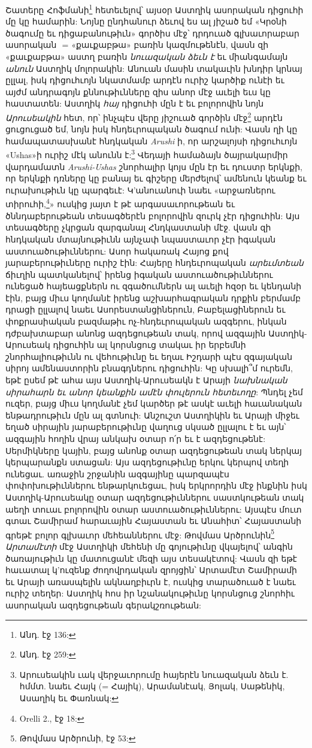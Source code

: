 \documentclass{article}
\newcommand*\svgAAAB{}
\begin{document}
{Շատերը Հոֆմանի\footnote{Անդ. էջ 136:} հետեւելով՝ այսօր Աստղիկ ասորական դիցուհի մը կը համարին: Նոյնը ընդհանուր ձեւով ես ալ յիշած եմ «Կրօնի ծագումը եւ դիցաբանութիւն» գործիս մէջ՝ դրդուած գլխաւորաբար ասորական $\svgAAAB$ = «քաւքաբթա» բառին կազմութենէն, վասն զի «քաւքաբթա» աստղ բառին \emph{նուազական ձեւն է} եւ միանգամայն \emph{անուն} Աստղիկ մոլորակին: Անուան մասին տակաւին խնդիր կրնայ ըլլալ, իսկ դիցուհւոյն նկատմամբ արդէն ուրիշ կարծիք ունէի եւ այժմ անդրագոյն քննութիւնները զիս անոր մէջ աւելի եւս կը հաստատեն: Աստղիկ \emph{հայ} դիցուհի մըն է եւ բոլորովին նոյն \emph{Արուսեակին} հետ, որ՝ ինչպէս վերը յիշուած գործին մէջ\footnote{Անդ. էջ 259:} արդէն ցուցուցած եմ, նոյն իսկ հնդեւրոպական ծագում ունի: Վասն ղի կը համապատասխանէ հնդկական \emph{Arushi} ի, որ արշալոյսի դիցուհւոյն «Ushas»ի ուրիշ մէկ անունն է:\footnote{Արուսեակին ւակ վերջաւորումը հայերէն նուազական ձեւն է. հմմտ. նաեւ Հայկ (= Հայիկ), Արամանէակ, Յոլակ, Սաթենիկ, Ասաղիկ եւ Փառնակ:} Վեդայի համաձայն ծայրակարմիր վարդամատն \emph{Arushi-Ushas} շնորհալիր կոյս մըն էր եւ դուստր երկնքի, որ երկնքի դռները կը բանայ եւ գիշերը մերժելով՝ ամենուն կեանք եւ ուրախութիւն կը պարգեւէ: Կ'անուանուի նաեւ «արջառներու տիրուհի,\footnote{Orelli 2., էջ 18:}» ուսկից յայտ է թէ արգասաւորութեան եւ ծննդաբերութեան տեսագծերէն բոլորովին զուրկ չէր դիցուհին: Այս տեսագծերը չկրցան զարգանալ Հնդկաստանի մէջ. վասն զի հնդկական մտայնութիւնն այնչափ նպաստաւոր չէր իգական աստուածութիւններու: Ասոր հակառակ Հայոց քով յարաբերութիւները ուրիշ էին: Հայերը հնդեւրոպական \emph{արեւմտեան} ճիւղին պատկանելով՝ իրենց իգական աստուածութիւններու ունեցած հայեացքներն ու զգածումներն ալ աւելի հզօր եւ կենդանի էին, բայց միւս կողմանէ իրենց աշխարհագրական դրքին բերմամբ դրացի ըլլալով նաեւ Ասորեստանցիներուն, Բաբելացիներուն եւ փոքրասիական բազմաթիւ ոչ-հնդեւրոպական ազգերու, ինկան դժբախտաբար անոնց ազդեցութեան տակ, որով ազգային Աստղիկ-Արուսեակ դիցուհին ալ կորսնցուց տակաւ իր երբեմնի շնորհալիութիւնն ու վեհութիւնը եւ եղաւ Իշդարի պէս զգայական սիրոյ ամենաստորին բնագդներու դիցուհին: Կը սխալի՞մ ուրեմն, եթէ ըսեմ թէ ահա այս Աստղիկ-Արուսեակն է Արայի \emph{նախնական սիրահարն եւ անոր կեանքին ամէն փուլերուն հետեւողը}: Պնդել չեմ ուզեր, բայց միւս կողմանէ չեմ կարծեր թէ ասկէ աւելի հաւանական ենթադրութիւն մըն ալ գտնուի: Անշուշտ Աստղիկին եւ Արայի միջեւ եղած սիրային յարաբերութիւնը վաղուց սկսած ըլլալու է եւ այն՝ ազգային հողին վրայ անկախ օտար ո՛ր եւ է ազդեցութենէ: Սերմիկները կային, բայց անոնք օտար ազդեցութեան տակ ներկայ կերպարանքն ստացան: Այս ազդեցութիւնը երկու կերպով տեղի ունեցաւ. առաջին շրջանին ազգայինը պարզապէս փոփոխութիւններու ենթարկուեցաւ, իսկ երկրորդին մէջ ինքնին իսկ Աստղիկ-Արուսեակը օտար ազդեցութիւններու սաստկութեան տակ աեղի տուաւ բոլորովին օտար աստուածութիւններու: Այսպէս մուտ գտաւ Շամիրամ հարաւային Հայաստան եւ Անահիտ՝ Հայաստանի գրեթէ բոլոր գլխաւոր մեհեաններու մէջ: Թովմաս Արծրունին\footnote{Թովմաս Արծրունի, էջ 53:} \emph{Արտամէտի} մէջ Աստղիկի մեհենի մը գոյութիւնը վկայելով՝ անգին ծառայութիւն կը մատուցանէ մեզի այս տեսակէտով: Վասն զի եթէ հաւատալ կ'ուզենք ժողովրդական զրոյցին՝ Արտամէտ Շամիրամի եւ Արայի առասպելին ակնաղբիւրն է, ուսկից տարածուած է նաեւ ուրիշ տեղեր: Աստղիկ հոս իր նշանակութիւնը կորսնցուց շնորհիւ ասորական ազդեցութեան գերակշռութեան:

}
\end{document}

